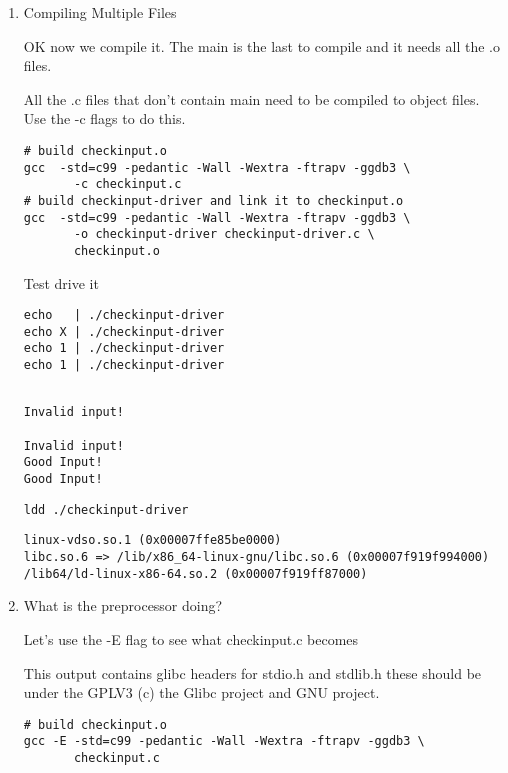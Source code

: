 \documentclass[11pt]{article}
\begin{document}
\begin{enumerate}
\item Compiling Multiple Files
\label{sec:orgc6f47e2}

OK now we compile it. The main is the last to compile and it needs all the .o files.

All the .c files that don't contain main need to be compiled to object
files. Use the -c flags to do this.

\begin{verbatim}
# build checkinput.o
gcc  -std=c99 -pedantic -Wall -Wextra -ftrapv -ggdb3 \
       -c checkinput.c
# build checkinput-driver and link it to checkinput.o
gcc  -std=c99 -pedantic -Wall -Wextra -ftrapv -ggdb3 \
       -o checkinput-driver checkinput-driver.c \
       checkinput.o
\end{verbatim}

Test drive it

\begin{verbatim}
echo   | ./checkinput-driver
echo X | ./checkinput-driver
echo 1 | ./checkinput-driver
echo 1 | ./checkinput-driver
\end{verbatim}

\begin{verbatim}

Invalid input!

Invalid input!
Good Input!
Good Input!
\end{verbatim}


\begin{verbatim}
ldd ./checkinput-driver
\end{verbatim}

\begin{verbatim}
linux-vdso.so.1 (0x00007ffe85be0000)
libc.so.6 => /lib/x86_64-linux-gnu/libc.so.6 (0x00007f919f994000)
/lib64/ld-linux-x86-64.so.2 (0x00007f919ff87000)
\end{verbatim}


\item What is the preprocessor doing?
\label{sec:org489d320}

Let's use the -E flag to see what checkinput.c becomes

This output contains glibc headers for stdio.h and stdlib.h these
should be under the GPLV3 (c) the Glibc project and GNU project.

\begin{verbatim}
# build checkinput.o
gcc -E -std=c99 -pedantic -Wall -Wextra -ftrapv -ggdb3 \
       checkinput.c
\end{verbatim}


\end{enumerate}
\end{document}
